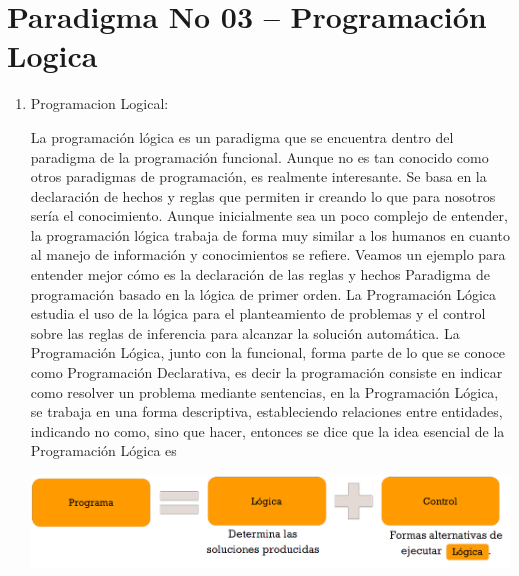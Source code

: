


\section{Paradigma No 03 – Programación Logica} 

\begin{enumerate}[1.]
	\item Programacion Logical:

La programación lógica es un paradigma que se encuentra dentro del paradigma de la programación funcional. Aunque no es tan conocido como otros paradigmas de programación, es realmente interesante. Se basa en la declaración de hechos y reglas que permiten ir creando lo que para nosotros sería el conocimiento. Aunque inicialmente sea un poco complejo de entender, la programación lógica trabaja de forma muy similar a los humanos en cuanto al manejo de información y conocimientos se refiere. Veamos un ejemplo para entender mejor cómo es la declaración de las reglas y hechos
Paradigma de programación basado en la lógica de primer orden. La Programación Lógica estudia el uso de la lógica para el planteamiento de problemas y el control sobre las reglas de inferencia para alcanzar la solución automática.
La Programación Lógica, junto con la funcional, forma parte de lo que se conoce como Programación Declarativa, es decir la programación consiste en indicar como resolver un problema mediante sentencias, en la Programación Lógica, se trabaja en una forma descriptiva, estableciendo relaciones entre entidades, indicando no como, sino que hacer, entonces se dice que la idea esencial de la Programación Lógica es

\begin{center}
\includegraphics[scale=0.40]{./Imagenes/img02.png} 
\end{center}


\end{enumerate}
